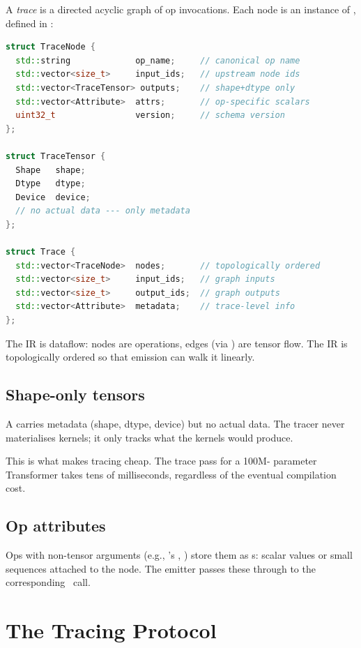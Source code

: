 A \emph{trace} is a directed acyclic graph of op invocations.
Each node is an instance of , defined in
:

\begin{lstlisting}[style=lucidcpp,language=C++]
struct TraceNode {
  std::string             op_name;     // canonical op name
  std::vector<size_t>     input_ids;   // upstream node ids
  std::vector<TraceTensor> outputs;    // shape+dtype only
  std::vector<Attribute>  attrs;       // op-specific scalars
  uint32_t                version;     // schema version
};

struct TraceTensor {
  Shape   shape;
  Dtype   dtype;
  Device  device;
  // no actual data --- only metadata
};

struct Trace {
  std::vector<TraceNode>  nodes;       // topologically ordered
  std::vector<size_t>     input_ids;   // graph inputs
  std::vector<size_t>     output_ids;  // graph outputs
  std::vector<Attribute>  metadata;    // trace-level info
};
\end{lstlisting}

The IR is dataflow: nodes are operations, edges (via
) are tensor flow. The IR is topologically
ordered so that emission can walk it linearly.

\subsection{Shape-only tensors}
\label{ssec:tracer:shape_only}

A  carries metadata (shape, dtype, device) but
no actual data. The tracer never materialises kernels; it only
tracks what the kernels would produce.

This is what makes tracing cheap. The trace pass for a 100M-
parameter Transformer takes tens of milliseconds, regardless of
the eventual compilation cost.

\subsection{Op attributes}
\label{ssec:tracer:attributes}

Ops with non-tensor arguments (e.g., 's
, ) store them as
s: scalar values or small sequences attached to
the node. The emitter passes these through to the corresponding
\MPSGraph\ call.

\section{The Tracing Protocol}
\label{sec:tracer:protocol}

